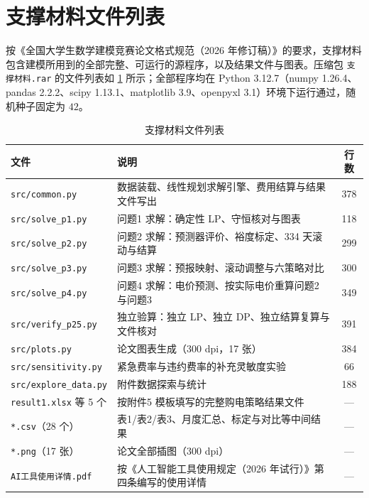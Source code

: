 \clearpage
\appendix
{}

\section{支撑材料文件列表}

按《全国大学生数学建模竞赛论文格式规范（2026 年修订稿）》\cite{cumcm2026format}的要求，支撑材料包含建模所用到的全部完整、可运行的源程序，以及结果文件与图表。压缩包 \verb|支撑材料.rar| 的文件列表如 \cref{tab:filelist} 所示；全部程序均在 Python 3.12.7（numpy 1.26.4、pandas 2.2.2、scipy 1.13.1、matplotlib 3.9、openpyxl 3.1）环境下运行通过，随机种子固定为 $42$。

\begin{table}[H]
  \centering
  \caption{支撑材料文件列表}
  \label{tab:filelist}
  \small
  \begin{tabular}{llc}
    \toprule[1.5pt]
    文件 & 说明 & 行数 \\
    \midrule[1pt]
    \verb|src/common.py|      & 数据装载、线性规划求解引擎、费用结算与结果文件写出 & 378 \\
    \verb|src/solve_p1.py|    & 问题1 求解：确定性 LP、守恒核对与图表 & 118 \\
    \verb|src/solve_p2.py|    & 问题2 求解：预测器评价、裕度标定、334 天滚动与结算 & 299 \\
    \verb|src/solve_p3.py|    & 问题3 求解：预报映射、滚动调整与六策略对比 & 300 \\
    \verb|src/solve_p4.py|    & 问题4 求解：电价预测、按实际电价重算问题2 与问题3 & 349 \\
    \verb|src/verify_p25.py|  & 独立验算：独立 LP、独立 DP、独立结算复算与文件核对 & 391 \\
    \verb|src/plots.py|       & 论文图表生成（300 dpi，17 张） & 384 \\
    \verb|src/sensitivity.py| & 紧急费率与违约费率的补充灵敏度实验 & 66 \\
    \verb|src/explore_data.py|& 附件数据探索与统计 & 188 \\
    \midrule[1pt]
    \verb|result1.xlsx| 等 5 个 & 按附件5 模板填写的完整购电策略结果文件 & --- \\
    \verb|*.csv|（28 个）      & 表1/表2/表3、月度汇总、标定与对比等中间结果 & --- \\
    \verb|*.png|（17 张）      & 论文全部插图（300 dpi） & --- \\
    \verb|AI工具使用详情.pdf|  & 按《人工智能工具使用规定（2026 年试行）》第四条编写的使用详情 & --- \\
    \bottomrule[1.5pt]
  \end{tabular}
\end{table}

